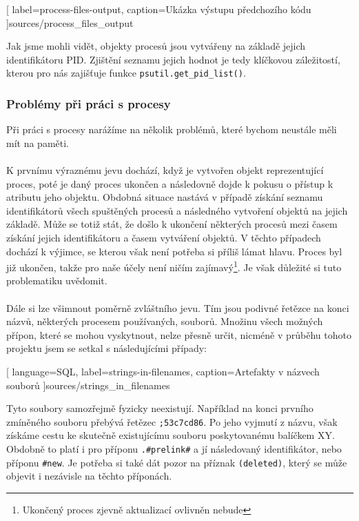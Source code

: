 \documentclass[
  field=inf,
  biblatex,
  glossaries,
  index
]{kidiplom}
\begin{document}
	
	[
		label=process-files-output,
		caption={Ukázka výstupu předchozího kódu}
	]{sources/process_files_output}

	Jak jsme mohli vidět, objekty procesů jsou vytvářeny na základě jejich identifikátoru PID\@. Zjištění seznamu jejich hodnot je tedy klíčkovou záležitostí, kterou pro nás zajišťuje funkce \texttt{psutil.get\_pid\_list()}.

	\subsubsection{Problémy při práci s procesy}
		Při práci s procesy narážíme na několik problémů, které bychom neustále měli mít na paměti.
		\\
		\\
		K prvnímu výraznému jevu dochází, když je vytvořen objekt reprezentující proces, poté je daný proces ukončen a následovně dojde k pokusu o přístup k atributu jeho objektu. Obdobná situace nastává v případě získání seznamu identifikátorů všech spuštěných procesů a následného vytvoření objektů na jejich základě. Může se totiž stát, že došlo k ukončení některých procesů mezi časem získání jejich identifikátoru a časem vytváření objektů. V těchto případech dochází k výjimce, se kterou však není potřeba si příliš lámat hlavu. Proces byl již ukončen, takže pro naše účely není ničím zajímavý\footnote{Ukončený proces zjevně aktualizací ovlivněn nebude}. Je však důležité si tuto problematiku uvědomit.
		\\
		\\
		Dále si lze všimnout poměrně zvláštního jevu. Tím jsou podivné řetězce na konci názvů, některých procesem používaných, souborů. Množinu všech možných přípon, které se mohou vyskytnout, nelze přesně určit, nicméně v průběhu tohoto projektu jsem se setkal s následujícími případy:

		
		[
			language=SQL,
			label=strings-in-filenames,
			caption={Artefakty v názvech souborů}
		]{sources/strings_in_filenames}

		Tyto soubory samozřejmě fyzicky neexistují. Například na konci prvního zmíněného souboru přebývá řetězec \texttt{;53c7cd86}. Po jeho vyjmutí z názvu, však získáme cestu ke skutečně existujícímu souboru poskytovanému balíčkem XY\@. Obdobně to platí i pro příponu \texttt{.\#prelink\#} a jí následovaný identifikátor, nebo příponu \texttt{\#new}. Je potřeba si také dát pozor na příznak \texttt{(deleted)}, který se může objevit i nezávisle na těchto příponách.
\end{document}
